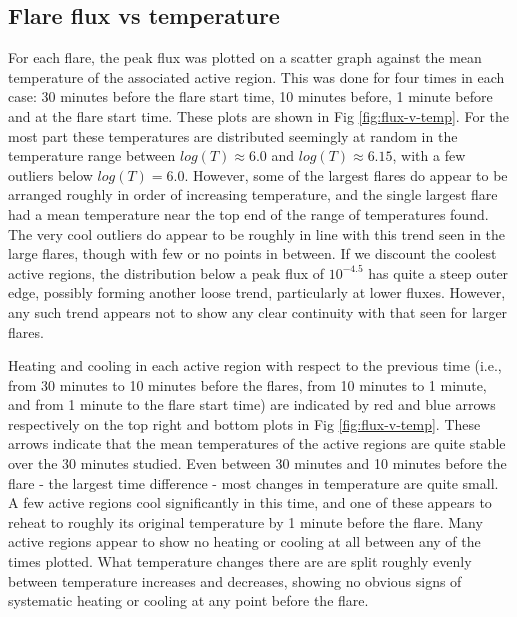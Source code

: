 \documentclass{article}
\begin{document}
\subsection{Flare flux vs temperature}
For each flare, the peak flux was plotted on a scatter graph against the mean temperature of the associated active region. %
This was done for four times in each case: 30 minutes before the flare start time, 10 minutes before, 1 minute before and at the flare start time.
These plots are shown in Fig \ref{fig:flux-v-temp}.
For the most part these temperatures are distributed seemingly at random in the temperature range between $log(T)\approx6.0$ and $log(T)\approx6.15$, with a few outliers below $log(T)=6.0$.
However, some of the largest flares do appear to be arranged roughly in order of increasing temperature, and the single largest flare had a mean temperature near the top end of the range of temperatures found.
The very cool outliers do appear to be roughly in line with this trend seen in the large flares, though with few or no points in between.
If we discount the coolest active regions, the distribution below a peak flux of $10^{-4.5}$ has quite a steep outer edge, possibly forming another loose trend, particularly at lower fluxes.
However, any such trend appears not to show any clear continuity with that seen for larger flares.

Heating and cooling in each active region with respect to the previous time (i.e., from 30 minutes to 10 minutes before the flares, from 10 minutes to 1 minute, and from 1 minute to the flare start time) are indicated by red and blue arrows respectively on the top right and bottom plots in Fig \ref{fig:flux-v-temp}.
These arrows indicate that the mean temperatures of the active regions are quite stable over the 30 minutes studied.
Even between 30 minutes and 10 minutes before the flare - the largest time difference - most changes in temperature are quite small.
A few active regions cool significantly in this time, and one of these appears to reheat to roughly its original temperature by 1 minute before the flare.
Many active regions appear to show no heating or cooling at all between any of the times plotted.
What temperature changes there are are split roughly evenly between temperature increases and decreases, showing no obvious signs of systematic heating or cooling at any point before the flare.
\end{document}
